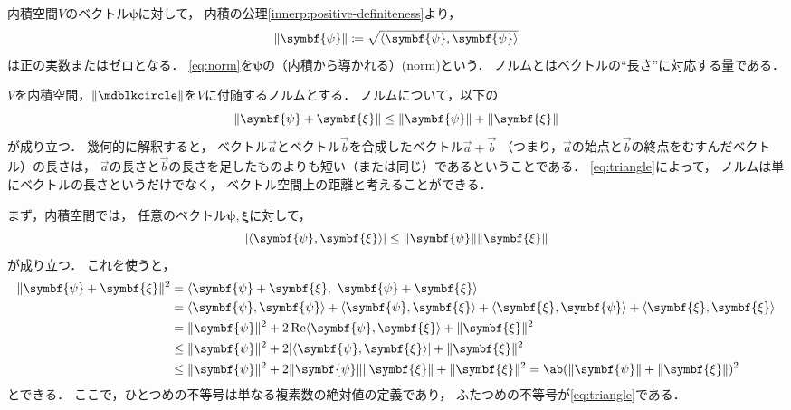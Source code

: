 \documentclass[
]{sotsu}
\newcommand{\bpsi}{\symbf{\psi}}
\newcommand{\bxi}{\symbf{\xi}}
\begin{document}
内積空間$V$のベクトル$\bpsi$に対して，
内積の公理\cref{innerp:positive-definiteness}より，
\begin{equation}
    \label{eq:norm}
    \norm{\bpsi} \coloneq \sqrt{\vphantom{\bpsi}\smash{\iparen{\bpsi, \bpsi}}}
\end{equation}
は正の実数またはゼロとなる．
\cref{eq:norm}を$\bpsi$の（内積から導かれる）(norm)という．
ノルムとはベクトルの``長さ''に対応する量である．

$V$を内積空間，$\norm{\bigdot}$を$V$に付随するノルムとする．
ノルムについて，以下の
\begin{equation}
    \label{eq:triangle}
    \norm{\bpsi + \bxi}
    \leq \norm{\bpsi} + \norm{\bxi}
\end{equation}
が成り立つ．
幾何的に解釈すると，
ベクトル$\vec{a}$とベクトル$\vec{b}$を合成したベクトル$\vec{a} + \vec{b}$
（つまり，$\vec{a}$の始点と$\vec{b}$の終点をむすんだベクトル）の長さは，
$\vec{a}$の長さと$\vec{b}$の長さを足したものよりも短い（または同じ）であるということである．
\cref{eq:triangle}によって，
ノルムは単にベクトルの長さというだけでなく，
ベクトル空間上の距離と考えることができる．

まず，内積空間では，
任意のベクトル$\bpsi, \bxi$に対して，
\begin{equation}
    \label{eq:Cauchy-Schwarz}
    \abs{\iparen{\bpsi, \bxi}} \leq \norm{\bpsi} \norm{\bxi}
\end{equation}
が成り立つ．
これを使うと，
\begin{equation*}
    \begin{split}
        \norm{\bpsi + \bxi}^2
        &= \iparen{\bpsi + \bxi, \  \bpsi + \bxi}
        \\
        &= \iparen{\bpsi, \bpsi}
            + \iparen{\bpsi, \bxi}
            + \iparen{\bxi, \bpsi}
            + \iparen{\bxi, \bxi}
        \\
        &= \norm{\bpsi}^2
            + 2 \Real \iparen{\bpsi, \bxi}
            + \norm{\bxi}^2
        \\
        &\leq \norm{\bpsi}^2 + 2 \abs{ \iparen{\bpsi, \bxi} } + \norm{\bxi}^2
        \\
        &\leq \norm{\bpsi}^2 + 2 \norm{\bpsi} \norm{\bxi} + \norm{\bxi}^2
        = \ab(\norm{\bpsi} + \norm{\bxi})^2
    \end{split}
\end{equation*}
とできる．
ここで，ひとつめの不等号は単なる複素数の絶対値の定義であり，
ふたつめの不等号が\cref{eq:triangle}である．
\end{document}

